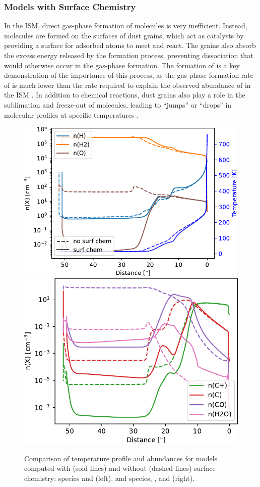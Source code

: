 \documentclass[12pt,a4paper]{article}
\begin{document}
\subsubsection{Models with Surface Chemistry} \label{sec:surfchem}
In the ISM, direct gas-phase formation of molecules is very inefficient. Instead, molecules are formed on the surfaces of dust grains, which act as catalysts by providing a surface for adsorbed atoms to meet and react. The grains also absorb the excess energy released by the formation process, preventing dissociation that would otherwise occur in the gas-phase formation. The formation of  is a key demonstration of the importance of this process, as the gas-phase formation rate of  is much lower than the rate required to explain the observed abundance of  in the ISM \parencite{Gould1963,Hollenbach1971}. In addition to chemical reactions, dust grains also play a role in the sublimation and freeze-out of molecules, leading to “jumps” or “drops” in molecular profiles at specific temperatures \parencite{Herbst2009}.

\begin{figure}[hb]
    \centering
    \includegraphics[width=.52\textwidth,keepaspectratio]{cmpsurfb_H_O.pdf}
    \includegraphics[width=.47\textwidth,keepaspectratio]{cmpsurfb_CO_H2O.pdf}
    \caption{Comparison of temperature profile and abundances for models computed with (soid lines) and without (dashed lines) surface chemistry:  species and  (left), and  species, , and  (right).} \label{fig:cmpsurfb}
\end{figure}
\end{document}
